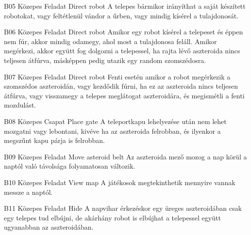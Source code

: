 \documentclass[../../projlab]{subfiles}
\begin{document}
\begin{funkovetelmeny}
	{B05}
	{Közepes}
	{Feladat}
	{Direct robot}
	{}
	{A telepes bármikor irányíthat a saját készített robotokat, vagy feltétlenül vándor a űrben, vagy mindig kísérel a tulajdonosát. }
    
\end{funkovetelmeny}

\begin{funkovetelmeny}
	{B06}
	{Közepes}
	{Feladat}
	{Direct robot}
	{}
	{Amikor egy robot kísérel a telepeset és éppen nem fúr, akkor mindig odamegy, ahol most a tulajdonosa feláll. Amikor megérkezi, akkor együtt fog dolgozni a telepessel, ha rajta lévő aszteroida nincs teljesen átfúrva, másképpen pedig utazik egy random szomszédosra.}
    
\end{funkovetelmeny}

\begin{funkovetelmeny}
	{B07}
	{Közepes}
	{Feladat}
	{Direct robot}
	{}
	{Fenti esetén amikor a robot megérkezik a szomszédos aszteroidán, vagy kezdődik fúrni, ha ez az aszteroida nincs teljesen átfúrva, vagy visszamegy a telepes meglátogat aszteroidára, és megismétli a fenti mozdulást.   }
    
\end{funkovetelmeny}

\begin{funkovetelmeny}
	{B08}
	{Közepes}
	{Csapat}
	{Place gate}
	{}
	{A teleportkapu lehelyezése után nem lehet mozgatni vagy lebontani, kivéve ha az aszteroida felrobban, és ilyenkor a megszűnt kapu párja is felrobban.}
    
\end{funkovetelmeny}

\begin{funkovetelmeny}
	{B09}
	{Közepes}
	{Feladat}
	{Move asteroid belt}
	{}
	{Az aszteroida mező mozog a nap körül a naptól való távolsága folyamatosan változik.}
    
\end{funkovetelmeny}

\begin{funkovetelmeny}
	{B10}
	{Közepes}
	{Feladat}
	{View map}
	{}
	{A játékosok megtekinthetik mennyire vannak messze a naptól.}
    
\end{funkovetelmeny}

\begin{funkovetelmeny}
	{B11}
	{Közepes}
	{Feladat}
	{Hide}
	{}
	{A napvihar érkezéskor egy üreges aszteroidában csak egy telepes tud elbújni, de akárhány robot is elbújhat a telepessel együtt ugyanabban az aszteroidában.}
    
\end{funkovetelmeny}
\end{document}
